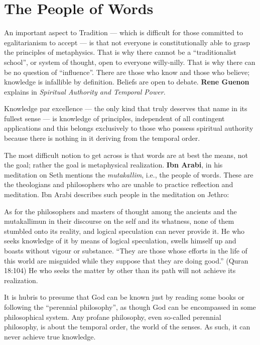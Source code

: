 \section{The People of Words}

An important aspect to Tradition --- which is difficult for those committed to egalitarianism to accept --- is that not everyone is constitutionally able to grasp the principles of metaphysics. That is why there cannot be a ``traditionalist school'', or system of thought, open to everyone willy-nilly. That is why there can be no question of ``influence''. There are those who know and those who believe; knowledge is infallible by definition. Beliefs are open to debate. \textbf{Rene Guenon} explains in \emph{Spiritual Authority and Temporal Power}.

\begin{quotex}
Knowledge par excellence --- the only kind that truly deserves that name in its fullest sense --- is knowledge of principles, independent of all contingent applications and this belongs exclusively to those who possess spiritual authority because there is nothing in it deriving from the temporal order.
\end{quotex}


The most difficult notion to get across is that words are at best the means, not the goal; rather the goal is metaphysical realization. \textbf{Ibn Arabi}, in his meditation on Seth mentions the \emph{mutakallim}, i.e., the people of words. These are the theologians and philosophers who are unable to practice reflection and meditation. Ibn Arabi describes such people in the meditation on Jethro:

\begin{quotex}
As for the philosophers and masters of thought among the ancients and the mutakallimun in their discourse on the self and its whatness, none of them stumbled onto its reality, and logical speculation can never provide it. He who seeks knowledge of it by means of logical speculation, swells himself up and boasts without vigour or substance. ``They are those whose efforts in the life of this world are misguided while they suppose that they are doing good.'' (Quran 18:104) He who seeks the matter by other than its path will not achieve its realization.
\end{quotex}


It is hubris to presume that God can be known just by reading some books or following the ``perennial philosophy'', as though God can be encompassed in some philosophical system. Any profane philosophy, even so-called perennial philosophy, is about the temporal order, the world of the senses. As such, it can never achieve true knowledge.

